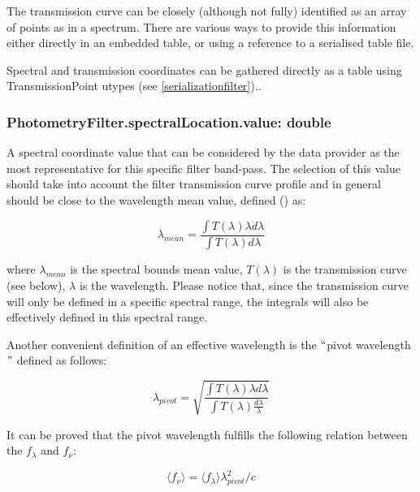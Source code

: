 \documentclass[11pt,a4paper]{ivoa}
\begin{document}
The transmission curve can be closely (although not fully) identified as an array 
of points as in a spectrum. There are various ways to provide this information 
either directly in an embedded table, or using a reference to a serialised table 
file.
\par

Spectral and transmission coordinates can be gathered directly as a table using 
TransmissionPoint utypes (see \ref{serializationfilter})\textit{.}.
\par

\subsubsection{PhotometryFilter.spectralLocation.value: double}
A spectral coordinate value that can be considered by the data provider as the 
most representative for this specific filter band-pass. The selection of this 
value should take into account the filter transmission curve profile and in 
general should be close to the wavelength mean value, defined 
(\citep{1982AJ.....87..670O}) as:
\par
\begin{equation} \label{eq:16}
\lambda_{mean} = \frac{\int T(\lambda)\lambda d\lambda}{\int T(\lambda)d\lambda}
\end{equation}

where $\lambda_{mean}$ is the spectral bounds mean value, $T(\lambda)$ is 
the transmission curve (see below), $\lambda$ is the wavelength. Please 
notice that, since the transmission curve will only be defined in a specific 
spectral range, the integrals will also be effectively defined in this 
spectral range.
\par

Another convenient definition of an effective wavelength is the 
$``$pivot wavelength$"$  defined as follows:

\begin{equation} \label{eq:17}
\lambda_{pivot} = \sqrt{\frac{\int T(\lambda)\lambda d\lambda}{\int T(\lambda)\frac{d\lambda}{\lambda}}}
\end{equation}

It can be proved that the pivot wavelength fulfills the following 
relation between the $f_\lambda$ and  $f_\nu $:

\begin{equation} \label{eq:18}
\langle f_\nu \rangle =\langle f_\lambda \rangle \lambda^2_{pivot}/c
\end{equation}
\end{document}
